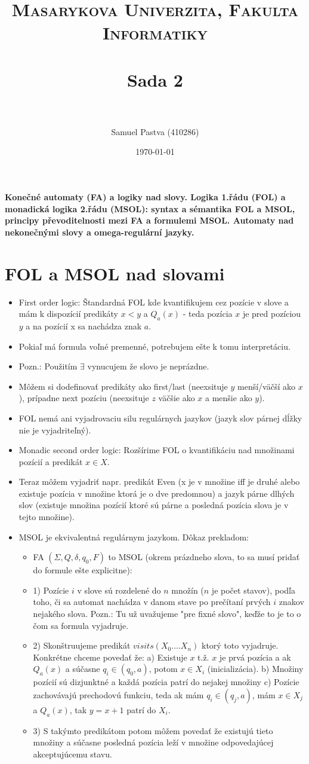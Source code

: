 \documentclass[paper=a4, fontsize=11pt]{scrartcl} %
\title{	
	\normalfont \normalsize 
	\textsc{Masarykova Univerzita, Fakulta Informatiky} \\ [25pt] %
	\horrule{0.5pt} \\[0.4cm] %
	\huge Sada 2 \\ %
	\horrule{2pt} \\[0.5cm] %
}
\author{Samuel Pastva (410286)} %
\date{\normalsize\today} %
\numberwithin{equation}{section} %
\numberwithin{figure}{section} %
\numberwithin{table}{section} %
\begin{document}
	
	\textbf{Konečné automaty (FA) a logiky nad slovy. Logika 1.řádu (FOL) a monadická logika 2.řádu (MSOL): syntax a sémantika FOL a MSOL, principy převoditelnosti mezi FA a formulemi MSOL. Automaty nad nekonečnými slovy a omega-regulární jazyky.}
	
	\section{FOL a MSOL nad slovami}
	
	\begin{itemize}
		\item First order logic: Štandardná FOL kde kvantifikujem cez pozície v slove a mám k dispozícií predikáty $x < y$ a $Q_a(x)$ - teda pozícia $x$ je pred pozíciou $y$ a na pozícií x sa nachádza znak $a$.
		\item Pokiaľ má formula voľné premenné, potrebujem ešte k tomu interpretáciu.
		\item Pozn.: Použitím $\exists$ vynucujem že slovo je neprázdne.
		\item Môžem si dodefinovať predikáty ako first/last (neexsituje $y$ menší/väčší ako $x$), prípadne next pozíciu (neexsituje $z$ väčšie ako $x$ a menšie ako $y$).
		\item FOL nemá ani vyjadrovaciu silu regulárnych jazykov (jazyk slov párnej dĺžky nie je vyjadriteľný). 
		\item Monadic second order logic: Rozšírime FOL o kvantifikáciu nad množinami pozícií a predikát $x \in X$.
		\item Teraz môžem vyjadriť napr. predikát Even (x je v množine iff je druhé alebo existuje pozícia v množine ktorá je o dve predomnou) a jazyk párne dlhých slov (existuje množina pozícií ktoré sú párne a posledná pozícia slova je v tejto množine).
		
		\item MSOL je ekvivalentná regulárnym jazykom. Dôkaz prekladom:
		
		\begin{itemize}
			\item FA $(\Sigma, Q, \delta, q_0, F)$ to MSOL (okrem prázdneho slova, to sa musí pridať do formule ešte explicitne):
			\item 1) Pozície $i$ v slove sú rozdelené do $n$ množín ($n$ je počet stavov), podľa toho, či sa automat nachádza v danom stave po prečítaní prvých $i$ znakov nejakého slova. Pozn.: Tu už uvažujeme "pre fixné slovo", keďže to je to o čom sa formula vyjadruje.
			\item 2) Skonštruujeme predikát $visits(X_0....X_n)$ ktorý toto vyjadruje. Konkrétne chceme povedať že: a) Existuje $x$ t.ž. $x$ je prvá pozícia a ak $Q_a(x)$ a súčasne $q_i \in (q_0, a)$, potom $x \in X_i$ (inicializácia). b) Množiny pozícií sú dizjunktné a každá pozícia patrí do nejakej množiny c) Pozície zachovávajú prechodovú funkciu, teda ak mám $q_i \in (q_j, a)$, mám $x \in X_j$ a $Q_a(x)$, tak $y = x + 1$ patrí do $X_i$.
			\item 3) S takýmto predikátom potom môžem povedať že existujú tieto množiny a súčasne posledná pozícia leží v množine odpovedajúcej akceptujúcemu stavu.
			

\end{itemize}
\end{itemize}
\end{document}
